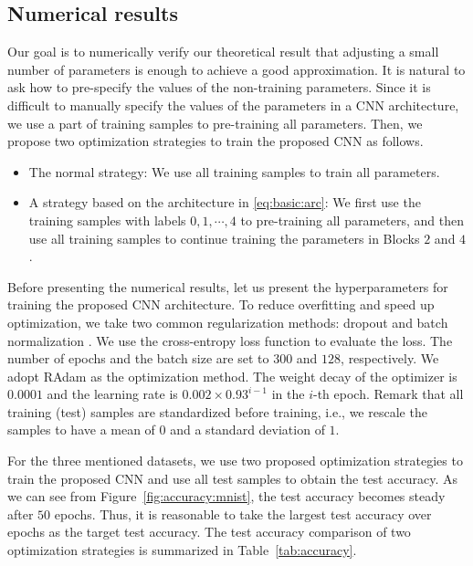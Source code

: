 \documentclass[nohyperref]{article}
\theoremstyle{plain}
\theoremstyle{definition}
\theoremstyle{remark}
\begin{document}
\subsection{Numerical results}
Our goal is to numerically verify our theoretical result that adjusting a small number of parameters is enough to achieve a good approximation. 
It is natural to ask
how to pre-specify the values of the non-training parameters.  Since it is difficult to manually specify the values of the parameters in a CNN architecture, we use a part of training samples to pre-training all parameters.
Then, we propose two optimization strategies to train the proposed CNN as follows.
\begin{itemize}
	\item[(S1)] The normal strategy: We use all training samples to train all parameters.
	
	\item[(S2)] A strategy based on the architecture in \eqref{eq:basic:arc}: We first use the training samples with labels $0,1,\cdots,4$ to pre-training all parameters, and then use all training samples to continue training the parameters in Blocks $2$ and $4$.
\end{itemize}


Before presenting the numerical results, 
let us present the hyperparameters for training the proposed CNN architecture. 
To reduce overfitting and speed up optimization,
we take two common regularization methods:
dropout \cite{DBLP:journals/corr/abs-1207-0580,JMLR:v15:srivastava14a} and batch normalization \cite{10.5555/3045118.3045167}. 
We use the cross-entropy loss function to evaluate the loss. 
The number of epochs and the batch size are set to $300$ and $128$, respectively.
We adopt 
RAdam \cite{Liu2020On}
as the
optimization method. The weight decay of the optimizer is $0.0001$ and the learning rate is $0.002\times0.93^{i-1}$ in the $i$-th epoch. 
Remark that all training (test) samples are standardized before training, i.e., we rescale the samples to have a mean of $0$ and a standard deviation of $1$.




For the three mentioned datasets, we use two proposed optimization strategies to train the proposed CNN and use all test samples to obtain the test accuracy.
As we can see from Figure~\ref{fig:accuracy:mnist}, the test accuracy becomes steady after $50$ epochs. Thus, it is reasonable to take 
the largest test accuracy over epochs as the target test accuracy. The test accuracy comparison of two optimization strategies is summarized in Table~\ref{tab:accuracy}.
\end{document}
